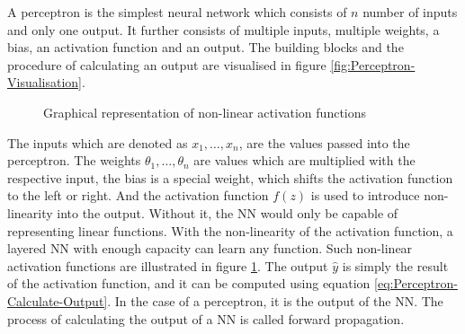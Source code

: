 \newline
\newline
A perceptron is the simplest neural network which consists of $n$ number of inputs and only one output. It further consists of multiple inputs, multiple weights, a bias, an activation function and an output. The building blocks and the procedure of calculating an output are visualised in figure \ref{fig:Perceptron-Visualisation}.

\begin{figure}[htbp]
    \centering
    \caption{Graphical representation of non-linear activation functions}
    \label{fig:Activation-Functions}
\end{figure}
\noindent
The inputs which are denoted as $x_1, \dots, x_n$, are the values passed into the perceptron. The weights $\theta_{1}, \dots, \theta_{n}$ are values which are multiplied with the respective input, the bias is a special weight, which shifts the activation function to the left or right. And the activation function $f(z)$ is used to introduce non-linearity into the output. Without it, the \gls{NN} would only be capable of representing linear functions. With the non-linearity of the activation function, a layered \gls{NN} with enough capacity can learn any function. Such non-linear activation functions are illustrated in figure \ref{fig:Activation-Functions}. The output $\hat{y}$ is simply the result of the activation function, and it can be computed using equation \ref{eq:Perceptron-Calculate-Output}. In the case of a perceptron, it is the output of the \gls{NN}. The process of calculating the output of a \gls{NN} is called forward propagation.
